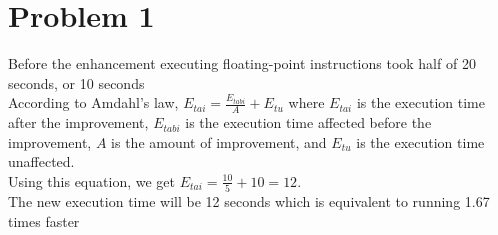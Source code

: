 \section*{Problem 1}
Before the enhancement executing floating-point instructions took half of 20 seconds, or 10 seconds\\
According to Amdahl's law, $\displaystyle E_{tai}=\frac{E_{tabi}}{A}+E_{tu}$ where $E_{tai}$ is the execution time after the improvement, $E_{tabi}$ is the execution time affected before the improvement, $A$ is the amount of improvement, and $E_{tu}$ is the execution time unaffected.\\
Using this equation, we get $\displaystyle E_{tai}=\frac{10}{5}+10=12$.\\
The new execution time will be 12 seconds which is equivalent to running 1.67 times faster
